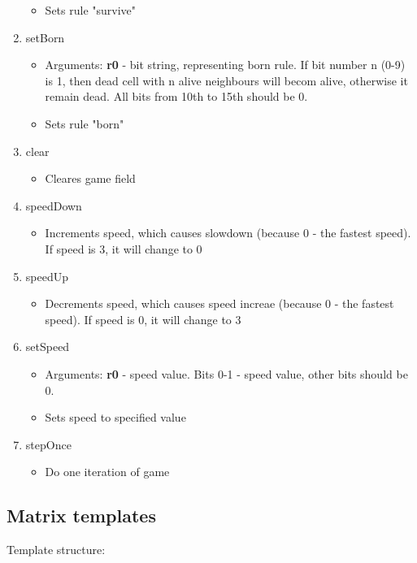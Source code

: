 \begin{enumerate}
\begin{itemize}
			\item Sets rule "survive"
		\end{itemize}
	\item setBorn
		\begin{itemize}
			\item Arguments: \textbf{r0} - bit string, representing born rule. If bit number n (0-9) is 1, then dead cell with n alive neighbours will becom alive, otherwise it remain dead. All bits from 10th to 15th should be 0.
			\item Sets rule "born"
		\end{itemize}
	\item clear
		\begin{itemize}
			\item Cleares game field
		\end{itemize}
	\item speedDown
		\begin{itemize}
			\item Increments speed, which causes slowdown (because 0 - the fastest speed). If speed is 3, it will change to 0
		\end{itemize}
	\item speedUp
		\begin{itemize}
			\item Decrements speed, which causes speed increae (because 0 - the fastest speed). If speed is 0, it will change to 3
		\end{itemize}
	\item setSpeed
		\begin{itemize}
			\item Arguments: \textbf{r0} - speed value. Bits 0-1 - speed value, other bits should be 0.
			\item Sets speed to specified value
		\end{itemize}
	\item stepOnce
		\begin{itemize}
			\item Do one iteration of game
		\end{itemize}
\end{enumerate}

\subsection*{Matrix templates}

Template structure:

